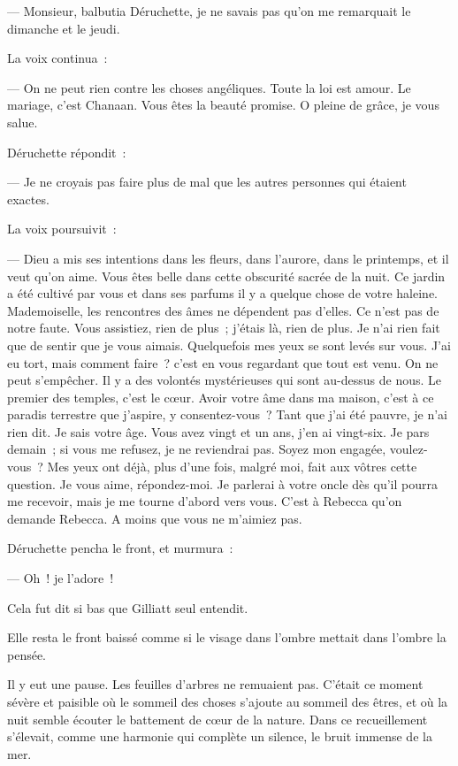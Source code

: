 \documentclass[french,twoside]{book} %
\begin{document}
— Monsieur, balbutia Déruchette, je ne savais pas qu’on me remarquait le dimanche et le jeudi.\par
La voix continua :\par
— On ne peut rien contre les choses angéliques. Toute la loi est amour. Le mariage, c’est Chanaan. Vous êtes la beauté promise. O pleine de grâce, je vous salue.\par
Déruchette répondit :\par
— Je ne croyais pas faire plus de mal que les autres personnes qui étaient exactes.\par
La voix poursuivit :\par
— Dieu a mis ses intentions dans les fleurs, dans l’aurore, dans le printemps, et il veut qu’on aime. Vous êtes belle dans cette obscurité sacrée de la nuit. Ce jardin a été cultivé par vous et dans ses parfums il y a quelque chose de votre haleine. Mademoiselle, les rencontres des âmes ne dépendent pas d’elles. Ce n’est pas de notre faute. Vous assistiez, rien de plus ; j’étais là, rien de plus. Je n’ai rien fait que de sentir que je  vous aimais. Quelquefois mes yeux se sont levés sur vous. J’ai eu tort, mais comment faire ? c’est en vous regardant que tout est venu. On ne peut s’empêcher. Il y a des volontés mystérieuses qui sont au-dessus de nous. Le premier des temples, c’est le cœur. Avoir votre âme dans ma maison, c’est à ce paradis terrestre que j’aspire, y consentez-vous ? Tant que j’ai été pauvre, je n’ai rien dit. Je sais votre âge. Vous avez vingt et un ans, j’en ai vingt-six. Je pars demain ; si vous me refusez, je ne reviendrai pas. Soyez mon engagée, voulez-vous ? Mes yeux ont déjà, plus d’une fois, malgré moi, fait aux vôtres cette question. Je vous aime, répondez-moi. Je parlerai à votre oncle dès qu’il pourra me recevoir, mais je me tourne d’abord vers vous. C’est à Rebecca qu’on demande Rebecca. A moins que vous ne m’aimiez pas.\par
Déruchette pencha le front, et murmura :\par
— Oh ! je l’adore !\par
Cela fut dit si bas que Gilliatt seul entendit.\par
Elle resta le front baissé comme si le visage dans l’ombre mettait dans l’ombre la pensée.\par
Il y eut une pause. Les feuilles d’arbres ne remuaient pas. C’était ce moment sévère et paisible où le sommeil des choses s’ajoute au sommeil des êtres, et où la nuit semble écouter le battement de cœur de la nature. Dans ce recueillement s’élevait, comme une harmonie qui complète un silence, le bruit immense de la mer.\par
\end{document}

